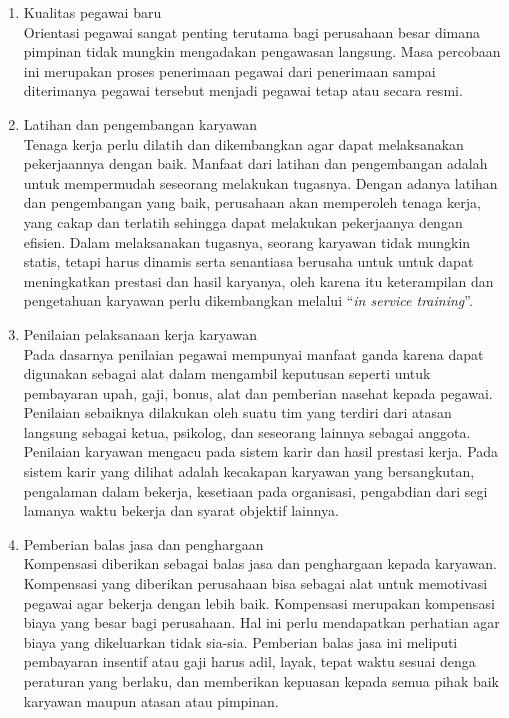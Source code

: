 \begin{enumerate}
\item Kualitas pegawai baru \\
Orientasi pegawai sangat penting terutama bagi perusahaan besar dimana pimpinan tidak mungkin mengadakan pengawasan langsung. Masa percobaan ini merupakan proses penerimaan pegawai dari penerimaan sampai diterimanya pegawai tersebut menjadi pegawai tetap atau secara resmi.

\item Latihan dan pengembangan karyawan \\
Tenaga kerja perlu dilatih dan dikembangkan agar dapat melaksanakan pekerjaannya dengan baik. Manfaat dari latihan dan pengembangan adalah untuk mempermudah seseorang melakukan tugasnya. Dengan adanya latihan dan pengembangan yang baik, perusahaan akan memperoleh tenaga kerja, yang cakap dan terlatih sehingga dapat melakukan pekerjaanya dengan efisien. Dalam melaksanakan tugasnya, seorang karyawan tidak mungkin statis, tetapi harus dinamis serta senantiasa berusaha untuk untuk dapat meningkatkan prestasi dan hasil karyanya, oleh karena itu keterampilan dan pengetahuan karyawan perlu dikembangkan melalui “\textit{in service training}”.

\item Penilaian pelaksanaan kerja karyawan \\
Pada dasarnya penilaian pegawai mempunyai manfaat ganda karena dapat digunakan sebagai alat dalam mengambil keputusan seperti untuk pembayaran upah, gaji, bonus, alat dan pemberian nasehat kepada pegawai. Penilaian sebaiknya dilakukan oleh suatu tim yang terdiri dari atasan langsung sebagai ketua, psikolog, dan seseorang lainnya sebagai anggota. Penilaian karyawan mengacu pada sistem karir dan hasil prestasi kerja. Pada sistem karir yang dilihat adalah kecakapan karyawan yang bersangkutan, pengalaman dalam bekerja, kesetiaan pada organisasi, pengabdian dari segi lamanya waktu bekerja dan syarat objektif lainnya. 

\item Pemberian balas jasa dan penghargaan \\
Kompensasi diberikan sebagai balas jasa dan penghargaan kepada karyawan. Kompensasi yang diberikan perusahaan bisa sebagai alat untuk memotivasi pegawai agar bekerja dengan lebih baik. Kompensasi merupakan kompensasi biaya yang besar bagi perusahaan. Hal ini perlu mendapatkan perhatian agar biaya yang dikeluarkan tidak sia-sia. Pemberian balas jasa ini meliputi pembayaran insentif atau gaji harus adil, layak, tepat waktu sesuai denga peraturan yang berlaku, dan memberikan kepuasan kepada semua pihak baik karyawan maupun atasan atau pimpinan.

\end{enumerate}

